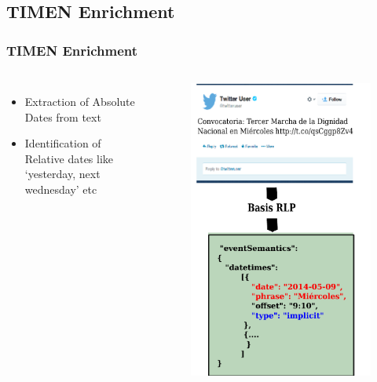 \documentclass[red]{beamer}
\begin{document}
\subsection{TIMEN Enrichment}
\begin{frame}
\frametitle{TIMEN Enrichment}
    \begin{columns}
        \begin{itemize}
            \item
                Extraction of Absolute Dates from text
            \item
                Identification of Relative dates like `yesterday, next wednesday' etc
        \end{itemize}
        \begin{figure}
            \includegraphics[scale=0.4]{timen_enrichment}
        \end{figure}
    \end{columns}
\end{frame}
\end{document}
